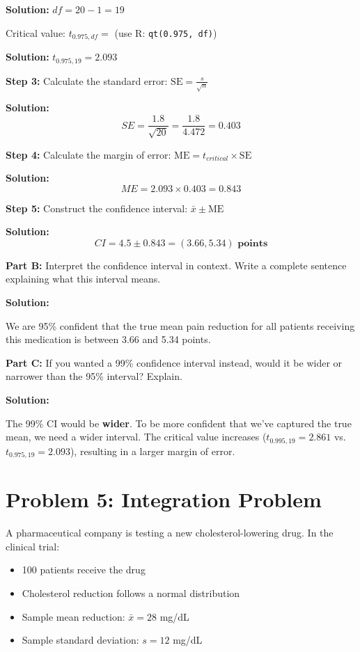 \documentclass[11pt]{article}
\begin{document}
\textcolor{correctgreen}{\textbf{Solution:}} $df = 20 - 1 = 19$

Critical value: $t_{0.975, df} = $ (use R: \texttt{qt(0.975, df)})

\textcolor{correctgreen}{\textbf{Solution:}} $t_{0.975, 19} = \mathbf{2.093}$

\textbf{Step 3:} Calculate the standard error: $\text{SE} = \frac{s}{\sqrt{n}}$

\textcolor{correctgreen}{\textbf{Solution:}}
$$SE = \frac{1.8}{\sqrt{20}} = \frac{1.8}{4.472} = \mathbf{0.403}$$

\textbf{Step 4:} Calculate the margin of error: $\text{ME} = t_{critical} \times \text{SE}$

\textcolor{correctgreen}{\textbf{Solution:}}
$$ME = 2.093 \times 0.403 = \mathbf{0.843}$$

\textbf{Step 5:} Construct the confidence interval: $\bar{x} \pm \text{ME}$

\textcolor{correctgreen}{\textbf{Solution:}}
$$CI = 4.5 \pm 0.843 = \mathbf{(3.66, 5.34) \text{ points}}$$

\vspace{0.5cm}

\textbf{Part B:} Interpret the confidence interval in context. Write a complete sentence explaining what this interval means.

\textcolor{correctgreen}{\textbf{Solution:}}

We are 95\% confident that the true mean pain reduction for all patients receiving this medication is between 3.66 and 5.34 points.

\vspace{0.5cm}

\textbf{Part C:} If you wanted a 99\% confidence interval instead, would it be wider or narrower than the 95\% interval? Explain.

\textcolor{correctgreen}{\textbf{Solution:}}

The 99\% CI would be \textbf{wider}. To be more confident that we've captured the true mean, we need a wider interval. The critical value increases ($t_{0.995, 19} = 2.861$ vs. $t_{0.975, 19} = 2.093$), resulting in a larger margin of error.

\newpage

\section{Problem 5: Integration Problem}

A pharmaceutical company is testing a new cholesterol-lowering drug. In the clinical trial:
\begin{itemize}
\item 100 patients receive the drug
\item Cholesterol reduction follows a normal distribution
\item Sample mean reduction: $\bar{x} = 28$ mg/dL
\item Sample standard deviation: $s = 12$ mg/dL
\end{itemize}
\end{document}
